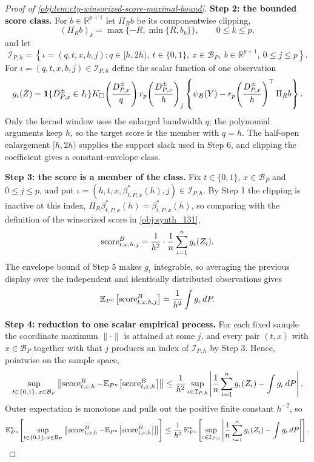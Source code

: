 \documentclass[11pt]{article}
\begin{document}
\begin{proof}[Proof of \cref{obj:lem:cty-winsorized-score-maximal-bound}]
\textbf{Step 2: the bounded score class.}  For \(b\in\mathbb R^{p+1}\) let \(\Pi_R b\) be its componentwise clipping,
\[
(\Pi_R b)_k=\max\{-R,\min\{R,b_k\}\},\qquad 0\leq k\leq p,
\]
and let
\[
\mathcal I_{P,h}
=
\left\{
\iota=(q,t,x,b,j):
q\in[h,2h),\ t\in\{0,1\},\ x\in\mathcal B_P,\ b\in\mathbb R^{p+1},\ 0\leq j\leq p
\right\}.
\]
For \(\iota=(q,t,x,b,j)\in\mathcal I_{P,h}\) define the scalar function of one observation
\[
g_\iota(Z)
=
\mathbf 1\{D^{\pm}_{P,x}\in I_t\}
K_\square\!\left({D^{\pm}_{P,x}\over q}\right)
r_p\!\left({D^{\pm}_{P,x}\over h}\right)_j
\left\{
\psi_B(Y)-r_p\!\left({D^{\pm}_{P,x}\over h}\right)^\top\Pi_R b
\right\}.
\]
Only the kernel window uses the enlarged bandwidth \(q\); the polynomial arguments keep \(h\), so the target score is the member with \(q=h\).  The half-open enlargement \([h,2h)\) supplies the support slack used in Step 6, and clipping the coefficient gives a constant-envelope class.

\textbf{Step 3: the score is a member of the class.}  Fix \(t\in\{0,1\}\), \(x\in\mathcal B_P\) and \(0\leq j\leq p\), and put \(\iota=(h,t,x,\beta^*_{t,P,x}(h),j)\in\mathcal I_{P,h}\).  By Step 1 the clipping is inactive at this index, \(\Pi_R\beta^*_{t,P,x}(h)=\beta^*_{t,P,x}(h)\), so comparing with the definition of the winsorized score in \cref{obj:synth_131},
\[
\operatorname{score}^{B}_{t,x,h,j}
=
{1\over h^{2}}\cdot{1\over n}\sum_{i=1}^n g_\iota(Z_i).
\]
The envelope bound of Step 5 makes \(g_\iota\) integrable, so averaging the previous display over the independent and identically distributed observations gives
\[
\mathbb E_{P^n}\!\left[\operatorname{score}^{B}_{t,x,h,j}\right]
=
{1\over h^{2}}\int g_\iota\,dP .
\]

\textbf{Step 4: reduction to one scalar empirical process.}  For each fixed sample the coordinate maximum \(\lVert\cdot\rVert\) is attained at some \(j\), and every pair \((t,x)\) with \(x\in\mathcal B_P\) together with that \(j\) produces an index of \(\mathcal I_{P,h}\) by Step 3.  Hence, pointwise on the sample space,
\[
\sup_{t\in\{0,1\},\,x\in\mathcal B_P}
\left\lVert
\operatorname{score}^{B}_{t,x,h}
-\mathbb E_{P^n}\!\left[\operatorname{score}^{B}_{t,x,h}\right]
\right\rVert
\leq
{1\over h^{2}}
\sup_{\iota\in\mathcal I_{P,h}}
\left|
{1\over n}\sum_{i=1}^n g_\iota(Z_i)-\int g_\iota\,dP
\right| .
\]
Outer expectation is monotone and pulls out the positive finite constant \(h^{-2}\), so
\[
\mathbb E_{P^n}^{*}\!\left[
\sup_{t\in\{0,1\},\,x\in\mathcal B_P}
\left\lVert
\operatorname{score}^{B}_{t,x,h}
-\mathbb E_{P^n}\!\left[\operatorname{score}^{B}_{t,x,h}\right]
\right\rVert
\right]
\leq
{1\over h^{2}}\,
\mathbb E_{P^n}^{*}\!\left[
\sup_{\iota\in\mathcal I_{P,h}}
\left|
{1\over n}\sum_{i=1}^n g_\iota(Z_i)-\int g_\iota\,dP
\right|
\right].
\]


\end{proof}
\end{document}
